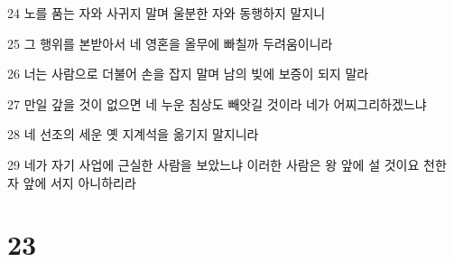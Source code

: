 \par 24 노를 품는 자와 사귀지 말며 울분한 자와 동행하지 말지니
\par 25 그 행위를 본받아서 네 영혼을 올무에 빠칠까 두려움이니라
\par 26 너는 사람으로 더불어 손을 잡지 말며 남의 빚에 보증이 되지 말라
\par 27 만일 갚을 것이 없으면 네 누운 침상도 빼앗길 것이라 네가 어찌그리하겠느냐
\par 28 네 선조의 세운 옛 지계석을 옮기지 말지니라
\par 29 네가 자기 사업에 근실한 사람을 보았느냐 이러한 사람은 왕 앞에 설 것이요 천한 자 앞에 서지 아니하리라

\chapter{23}

